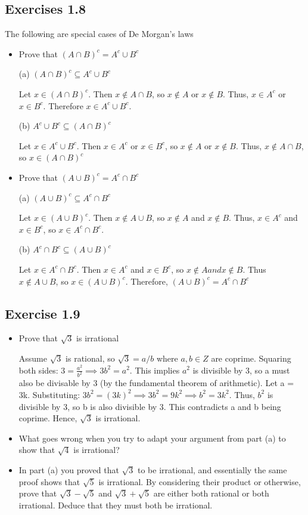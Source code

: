 \documentclass[12pt]{article}
\begin{document}
		\subsection*{Exercises 1.8}
			The following are special cases of De Morgan's laws
			\begin{itemize}
				\item Prove that $(A \cap B)^c = A^c \cup B^c$
				
					(a) $(A \cap B)^c \subseteq A^c \cup B^c$
					
					Let $x \in (A \cap B)^c$. Then $x \notin A \cap B$, so $x \notin A$ or $x \notin B$. Thus, $x \in A^c$ or $x \in B^c$. Therefore $x \in A^c \cup B^c$.
					
					(b) $A^c \cup B^c \subseteq (A \cap B)^c$
					
					Let $x \in A^c \cup B^c$.
					Then $x \in A^c$ or $x \in B^c$, so $x \notin A$ or $x \notin B$. Thus, $x \notin A \cap B$, so $x \in (A \cap B)^c$ 
				\item Prove that $(A \cup B)^c = A^c \cap B^c$
					
					(a) $(A \cup B)^c \subseteq A^c \cap B^c$
					
					Let $x \in (A \cup B)^c$.
					Then $x \notin A \cup B$, so $x \notin A$ and $x \notin B$. Thus, $x \in A^c$ and $x \in B^c$, so $x \in A^c \cap B^c$.
					
					(b) $A^c \cap B^c \subseteq (A \cup B)^c$
					
					Let $x \in A^c \cap B^c$.
					Then $x \in A^c$ and $x \in B^c$, so $x \notin A and x \notin B$. Thus $x \notin A \cup B$, so $x \in (A \cup B)^c$. Therefore, $(A \cup B)^c = A^c \cap B^c$
			\end{itemize}
		\subsection*{Exercise 1.9}
			\begin{itemize}
				\item Prove that $\sqrt{3}$ is irrational
				
				Assume $\sqrt{3}$ is rational, so $\sqrt{3} = a/b$ where $a,b \in Z$ are coprime. Squaring both sides:
				$3 = \frac{a^2}{b^2} \implies 3b^2 = a^2$. This implies $a^2$ is divisible by 3, so a must also be divisable by 3 (by the fundamental theorem of arithmetic). Let a = 3k. Substituting:
				$3b^2 = (3k)^2 \implies 3b^2 = 9k^2 \implies b^2 = 3k^2$. Thus, $b^2$ is divisible by 3, so b is also divisible by 3. This contradicts a and b being coprime. Hence, $\sqrt{3}$ is irrational.
				\item What goes wrong when you try to adapt your argument from part (a) to show that $\sqrt{4}$ is irrational?
				\item In part (a) you proved that $\sqrt{3}$ to be irrational, and essentially the same proof shows that $\sqrt{5}$ is irrational. By considering their product or otherwise, prove that $\sqrt{3} - \sqrt{5}$ and $\sqrt{3} + \sqrt{5}$ are either both rational or both irrational. Deduce that they must both be irrational.
			\end{itemize}
\end{document}

